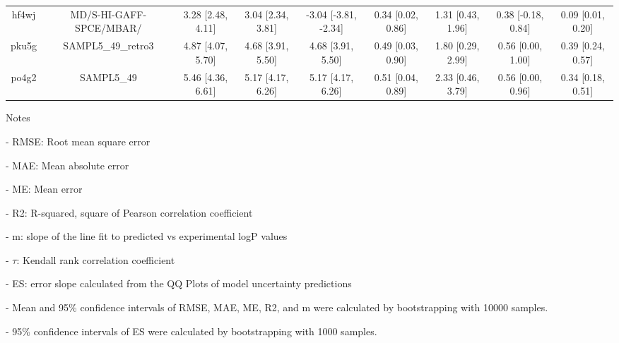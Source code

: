 \documentclass{article}
\begin{document}
\begin{center}
\begin{longtable}{|ccccccccc|}
 hf4wj &                            MD/S-HI-GAFF-SPCE/MBAR/ &  3.28 [2.48, 4.11] &  3.04 [2.34, 3.81] &  -3.04 [-3.81, -2.34] &  0.34 [0.02, 0.86] &    1.31 [0.43, 1.96] &   0.38 [-0.18, 0.84] &     0.09 [0.01, 0.20] \\
 pku5g &                                 SAMPL5\_49\_retro3 &  4.87 [4.07, 5.70] &  4.68 [3.91, 5.50] &     4.68 [3.91, 5.50] &  0.49 [0.03, 0.90] &    1.80 [0.29, 2.99] &    0.56 [0.00, 1.00] &     0.39 [0.24, 0.57] \\
 po4g2 &                                         SAMPL5\_49 &  5.46 [4.36, 6.61] &  5.17 [4.17, 6.26] &     5.17 [4.17, 6.26] &  0.51 [0.04, 0.89] &    2.33 [0.46, 3.79] &    0.56 [0.00, 0.96] &     0.34 [0.18, 0.51] \\
\end{longtable}
\end{center}

Notes

- RMSE: Root mean square error

- MAE: Mean absolute error

- ME: Mean error

- R2: R-squared, square of Pearson correlation coefficient

- m: slope of the line fit to predicted vs experimental logP values

- $\tau$:  Kendall rank correlation coefficient

- ES: error slope calculated from the QQ Plots of model uncertainty predictions

- Mean and 95\% confidence intervals of RMSE, MAE, ME, R2, and m were calculated by bootstrapping with 10000 samples.

- 95\% confidence intervals of ES were calculated by bootstrapping with 1000 samples.\end{document}
\end{document}
